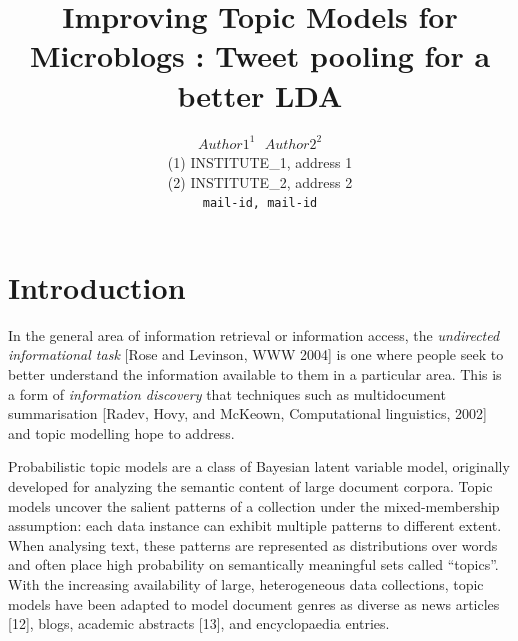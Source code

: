 \documentclass[10pt,a5paper,twoside]{article}
\title{Improving Topic Models for Microblogs : Tweet pooling for a better LDA}
\author{$Author1^{1}~~~Author2^{2}$\\
{\small  	(1) INSTITUTE\_1, address 1\\ 
 		(2) INSTITUTE\_2, address 2\\
  \texttt{mail-id, mail-id} \\ 
}}
\begin{document}
\maketitle


\section{Introduction}


In the general area of information retrieval or information access,
the {\it undirected informational task} 
[Rose and Levinson, WWW 2004] is one where people seek to
better understand the information available to them in a particular area.
This is a form of {\it information discovery} that techniques
such as multidocument summarisation [Radev, Hovy, and McKeown, Computational linguistics, 2002] and topic modelling hope to address.

Probabilistic topic models are a class of Bayesian latent variable
model, originally developed for analyzing the semantic content of
large document corpora. Topic models uncover the salient patterns of a
collection under the mixed-membership assumption: each data instance
can exhibit multiple patterns to different extent. When analysing
text, these patterns are represented as distributions over words and
often place high probability on semantically meaningful sets called
“topics”. With the increasing availability of large, heterogeneous
data collections, topic models have been adapted to model document
genres as diverse as news articles [12], blogs, academic abstracts [13], 
and encyclopaedia entries.
\end{document}
